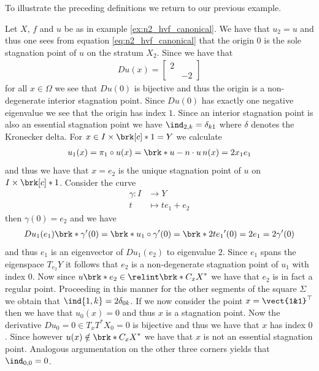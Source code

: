 To illustrate the preceding definitions we return to our previous example.
\begin{example}\label{ex:n2_hvf_index}
  Let $X$, $f$ and $u$ be as in example \ref{ex:n2_hvf_canonical}.
  We have that $u_2=u$ and thus
  one sees from equation \eqref{eq:n2_hvf_canonical}
  that the origin $0$ is the sole stagnation point of $u$ on the stratum $X_2$. Since we have that
  \begin{align*}
    Du(x) = \begin{bmatrix}
      2 & \\
       & -2
    \end{bmatrix}
  \end{align*}
  for all $x\in\Omega$ we see that $Du(0)$ is bijective and thus the origin is a non-degenerate interior stagnation point.
  Since $Du(0)$ has
  exactly one negative eigenvalue we see that the origin has index $1$. 
  Since an interior stagnation point is also an essential stagnation point 
  we have $\ind_{2,k}=\delta_{k1}$ where $\delta$ denotes the Kronecker delta.
  For $x\in I\times\brk[c]*{1}=Y$ we calculate
  \begin{align*}
    u_1(x)=\pi_1\circ u(x)=\brk*{u-n\cdot u \,n}(x)
    =2x_1e_1
  \end{align*}
  and thus we have that $x=e_2$ is the unique stagnation point of $u$ on $I\times\brk[c]*{1}$.
  Consider the curve
  \begin{align*}
    \gamma\colon I&\to Y\\
    t&\mapsto te_1+e_2
  \end{align*}
  then $\gamma(0)=e_2$ and we have
  \begin{align*}
    Du_1(e_1)\brk*{\gamma'(0)}
    =\brk*{u_1\circ \gamma}'(0)
    =\brk*{2te_1}'(0)=2e_1=2\gamma'(0)
  \end{align*}
  and thus $e_1$ is an eigenvector of $Du_1(e_2)$ to eigenvalue $2$. Since $e_1$
  spans the eigenspace $T_{e_2}Y$ it follows that $e_2$ is a non-degenerate stagnation point
  of $u_1$ with index $0$.
  Now since $u\brk*{e_2}\in\relint\brk*{C_xX}^*$ we have that $e_2$ is in fact a regular point.
  Proceeding in this manner for the other segments of the square $\Sigma$ we obtain that
  $\ind{1,k}=2\delta_{0k}$.
  If we now consider the point $x=\vect{1&1}^\top$ then we have that $u_0(x)=0$ and thus $x$ is a stagnation
  point.
  Now the derivative $Du_0=0\in T_xT^*X_0=0$ is bijective and thus
  we have that $x$ has
  index $0$. Since however $u(x)\notin \brk*{C_xX}^*$ we have that $x$ is not an essential stagnation point.
  Analogous argumentation on the other three corners yields that $\ind_{0,0}=0$.
\end{example}

